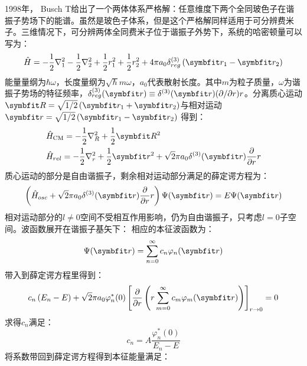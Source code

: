 1998年， Busch T给出了一个两体体系严格解\cite{busch1998two}：任意维度下两个全同玻色子在谐振子势场下的能谱。虽然是玻色子体系，但是这个严格解同样适用于可分辨费米子。三维情况下，可分辨两体全同费米子位于谐振子外势下，系统的哈密顿量可以写为：
\begin{equation}
\hat{H}=-\frac{1}{2} \nabla_{1}^{2}-\frac{1}{2} \nabla_{2}^{2}+\frac{1}{2} r_{1}^{2}+\frac{1}{2} r_{2}^{2}+4 \pi a_{0} \delta^{(3)}_{reg}\left(\Vector{r}_{1}-\Vector{r}_{2}\right)
\end{equation}
能量量纲为$\hbar\omega$，长度量纲为$\sqrt{\hbar}{m\omega}$，$a_0$代表散射长度。其中$m$为粒子质量，$\omega$为谐振子势场的特征频率，$\delta_{reg}^{(3)}(\Vector{r}) \equiv \delta^{(3)}(\Vector{r})(\partial / \partial r) r$。分离质心运动$\Vector{R}=\sqrt{1 / 2}\left(\Vector{r}_{1}+\Vector{r}_{2}\right)$与相对运动$\Vector{r}=\sqrt{1 / 2}\left(\Vector{r}_{1}-\Vector{r}_{2}\right)$
得到：
\begin{equation}
\begin{aligned}
&\hat{H}_{\mathrm{CM}}=-\frac{1}{2} \nabla_{R}^{2}+\frac{1}{2} \Vector{R}^{2}\\
&\hat{H}_{rel}=-\frac{1}{2} \nabla_{r}^{2}+\frac{1}{2} \Vector{r}^{2}+\sqrt{2} \pi a_{0} \delta^{(3)}(\Vector{r}) \frac{\partial}{\partial r} r\\
\end{aligned}
\end{equation}
质心运动的部分是自由谐振子，剩余相对运动部分满足的薛定谔方程为：
\begin{equation}
\left(\hat{H}_{o s c}+\sqrt{2} \pi a_{0} \delta^{(3)}(\Vector{r}) \frac{\partial}{\partial r} r\right) \Psi(\Vector{r})=E \Psi(\Vector{r})
\end{equation}
相对运动部分的$l\neq0$空间不受相互作用影响，仍为自由谐振子，只考虑$l=0$子空间。波函数展开在谐振子基矢下：
相应的本征波函数为：
\begin{equation}
\Psi(\Vector{r})=\sum_{n=0}^{\infty} c_{n} \varphi_{n}(\Vector{r})
\end{equation}
带入到薛定谔方程里得到：
\begin{equation}
c_{n}\left(E_{n}-E\right)+\sqrt{2} \pi a_{0} \varphi_{n}^{*}(0)\left[\frac{\partial}{\partial r}\left(r \sum_{m=0}^{\infty} c_{m} \varphi_{m}(\Vector{r})\right)\right]_{r \rightarrow 0}=0
\end{equation}
求得$c_n$满足：
\begin{equation}
c_{n}=A \frac{\varphi_{n}^{*}(0)}{E_{n}-E}
\end{equation}
将系数带回到薛定谔方程得到本征能量满足：
